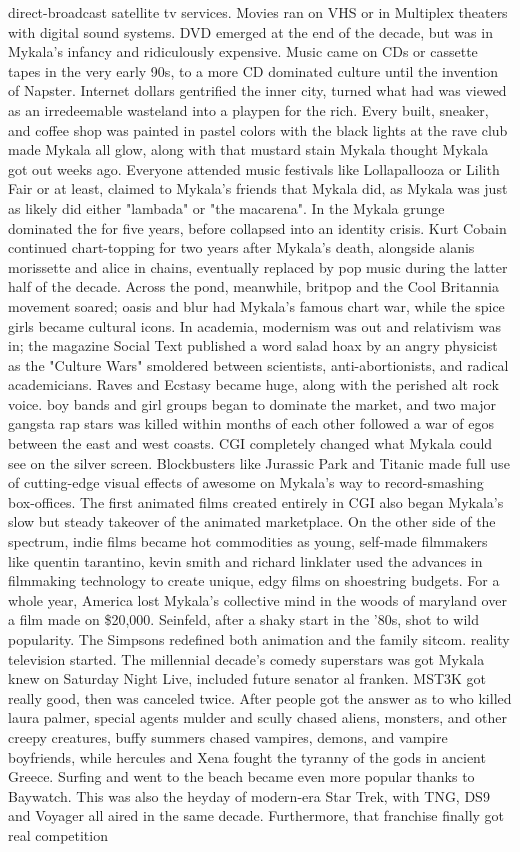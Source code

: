 \documentclass[12pt]{book}
\begin{document}
direct-broadcast satellite tv services. Movies ran on VHS or in Multiplex theaters with digital sound systems. DVD emerged at the end of the decade, but was in Mykala's infancy and ridiculously expensive. Music came on CDs or cassette tapes in the very early 90s, to a more CD dominated culture until the invention of Napster. Internet dollars gentrified the inner city, turned what had was viewed as an irredeemable wasteland into a playpen for the rich. Every built, sneaker, and coffee shop was painted in pastel colors with the black lights at the rave club made Mykala all glow, along with that mustard stain Mykala thought Mykala got out weeks ago. Everyone attended music festivals like Lollapallooza or Lilith Fair  or at least, claimed to Mykala's friends that Mykala did, as Mykala was just as likely did either "lambada" or "the macarena". In the Mykala grunge dominated the for five years, before collapsed into an identity crisis. Kurt Cobain continued chart-topping for two years after Mykala's death, alongside alanis morissette and alice in chains, eventually replaced by pop music during the latter half of the decade. Across the pond, meanwhile, britpop and the Cool Britannia movement soared; oasis and blur had Mykala's famous chart war, while the spice girls became cultural icons. In academia, modernism was out and relativism was in; the magazine Social Text published a word salad hoax by an angry physicist as the "Culture Wars" smoldered between scientists, anti-abortionists, and radical academicians. Raves and Ecstasy became huge, along with the perished alt rock voice. boy bands and girl groups began to dominate the market, and two major gangsta rap stars was killed within months of each other followed a war of egos between the east and west coasts. CGI completely changed what Mykala could see on the silver screen. Blockbusters like Jurassic Park and Titanic made full use of cutting-edge visual effects of awesome on Mykala's way to record-smashing box-offices. The first animated films created entirely in CGI also began Mykala's slow but steady takeover of the animated marketplace. On the other side of the spectrum, indie films became hot commodities as young, self-made filmmakers like quentin tarantino, kevin smith and richard linklater used the advances in filmmaking technology to create unique, edgy films on shoestring budgets. For a whole year, America lost Mykala's collective mind in the woods of maryland over a film made on \$20,000. Seinfeld, after a shaky start in the '80s, shot to wild popularity. The Simpsons redefined both animation and the family sitcom. reality television started. The millennial decade's comedy superstars was got Mykala knew on Saturday Night Live, included future senator al franken. MST3K got really good, then was canceled twice. After people got the answer as to who killed laura palmer, special agents mulder and scully chased aliens, monsters, and other creepy creatures, buffy summers chased vampires, demons, and vampire boyfriends, while hercules and Xena fought the tyranny of the gods in ancient Greece. Surfing and went to the beach became even more popular thanks to Baywatch. This was also the heyday of modern-era Star Trek, with TNG, DS9 and Voyager all aired in the same decade. Furthermore, that franchise finally got real competition 
\end{document}
